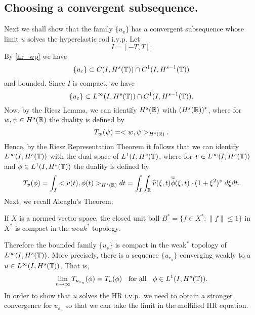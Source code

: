 \subsection{Choosing  a convergent subsequence.}
%
Next we shall show that  the family $\{ u_\ee\}$ has a convergent subsequence
whose limit $u$ solves the hyperelastic rod i.v.p. 
Let
$$
I= [-T, T].
$$
By \cref{hr_wp} we have 
%
\begin{equation}
\label{C-1-fam}
\{u_\varepsilon\}\subset C(I, H^s(\mathbb{T}))\cap C^1(I, H^{s-1}(\mathbb{T}))
\end{equation}
%
and bounded. Since $I$ is compact, we have  
%
\begin{equation}
\label{Lip-1-fam}
\{u_\varepsilon\}\subset L^{\infty}(I, H^s(\mathbb{T}))\cap C^1(I,
H^{s-1}(\mathbb{T})).
\end{equation}
%
Now, by the Riesz Lemma, we can identify $H^s(\mathbb{R})$ with
$(H^s(\mathbb{R}))^*$, where for $w, \psi \in H^s(\mathbb{R})$ the duality is
defined by 
\begin{equation*}
T_w(\psi) = <w, \psi>_{H^s(\mathbb{R})}.
\end{equation*}
Hence, by the Riesz Representation Theorem it follows that we can
identify \\ $L^\infty(I, H^s(\mathbb{T})) $ with the dual space of $L^1(I,
H^{s}(\mathbb{T})$, where for $v\in L^\infty(I, H^s(\mathbb{T})) $ and $ \phi \in
L^1(I, H^{s}(\mathbb{T}))$ the duality is defined by  
%
\begin{equation}
T_v(\phi) = \int_I <v (t), \phi (t)>_{H^s(\mathbb{R})} dt  = \int_I
\int_{\mathbb{R}}
\widehat{v}(\xi, t) \overline{\widehat{\phi}}(\xi, t) \cdot (1
+ \xi^2)^s \ d \xi dt.
\end{equation}
%
Next, we recall Aloaglu's Theorem:
\begin{theorem}
If $X$ is a normed vector space,
the closed unit ball $B^* = \{f \in X^* : \|f\| \le
1\}$ in $X^*$ is compact in the $weak^*$ topology.
\end{theorem}
Therefore the bounded family $\{u_\ee\}$ is compact 
in the weak$^*$ topology of \\
$L^\infty(I, H^s(\mathbb{T}))$. More precisely,
there is a sequence  $\{ u_{\ee_n} \}$ converging
weakly to a $ u\in L^{\infty}(I, H^s(\mathbb{T}))$.
That is,
%
\begin{equation}
\label{weak-conv}
\lim_{n\to \infty} T_{u_{\varepsilon_n}}(\phi)  =  T_u (\phi) 
\; \; \ 		
\text{for all} \ \;\;  \phi \in L^1(I, H^{s}(\mathbb{T})).
\end{equation}
%
In order to show that  $u$ solves the HR i.v.p.\ we need to 
obtain a stronger  convergence for  $u_{\ee_n}$ so that 
we can take the limit in the mollified HR equation.
